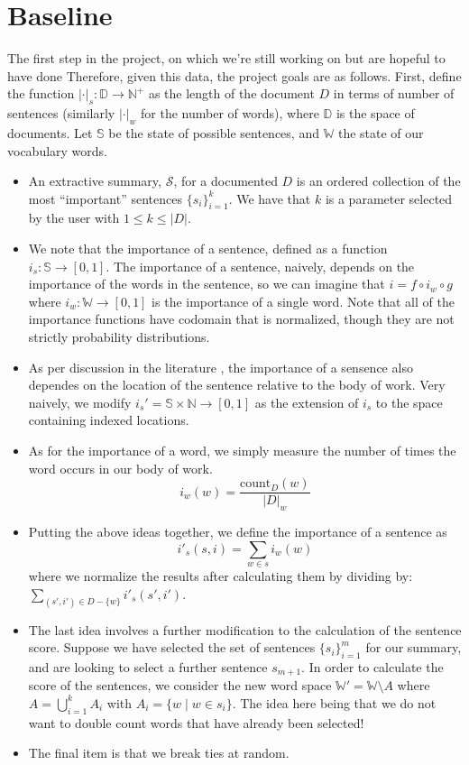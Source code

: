\documentclass[10pt]{article}
\begin{document}
\section{Baseline}
The first step in the project, on which we're still working on but are hopeful to have done
Therefore, given this data, the project goals are as follows. First, define the function $|\cdot|_s : \mathbb{D} \to \mathbb{N}^+$ as the length of the document $D$ in terms of number of sentences (similarly $|\cdot|_w$ for the number of words), where $\mathbb{D}$ is the space of documents. Let $\mathbb{S}$ be the state of possible sentences, and $\mathbb{W}$ the state of our vocabulary words.
\begin{itemize}
\item An extractive summary, $\mathcal{S}$, for a documented $D$ is an ordered collection of the most ``important'' sentences $\{s_i\}_{i=1}^k$. We have that $k$ is a parameter selected by the user with $1 \leq k \leq |D|$.
\item We note that the importance of a sentence, defined as a function $i_s: \mathbb{S} \to [0,1]$. The importance of a sentence, naively, depends on the importance of the words in the sentence, so we can imagine that $i = f \circ i_w \circ g$ where $i_w: \mathbb{W} \to [0,1]$ is the importance of a single word. Note that all of the importance functions have codomain that is normalized, though they are not strictly probability distributions.
\item As per discussion in the literature \cite{sentence_summary} \cite{hmm_summary} \cite{survey}, the importance of a sensence also dependes on the location of the sentence relative to the body of work. Very naively, we modify $i_s' = \mathbb{S} \times \mathbb{N} \to [0,1]$ as the extension of $i_s$ to the space containing indexed locations.
\item As for the importance of a word, we simply measure the number of times the word occurs in our body of work.
$$
i_w(w) = \frac{\text{count}_D(w)}{|D|_w}
$$
\item Putting the above ideas together, we define the importance of a sentence as
$$
i'_s(s,i) = \sum_{w \in s} i_w(w)
$$
where we normalize the results after calculating them by dividing by: $\sum_{(s',i') \in D - \{w\}} i'_s(s',i')$.
\item The last idea involves a further modification to the calculation of the sentence score. Suppose we have selected the set of sentences $\{s_i\}_{i=1}^m$ for our summary, and are looking to select a further sentence $s_{m+1}$. In order to calculate the score of the sentences, we consider the new word space $\mathbb{W'} = \mathbb{W} \setminus A$ where $A = \bigcup_{i=1}^k A_i$ with $A_i = \{w \mid w \in s_i\}$. The idea here being that we do not want to double count words that have already been selected!
\item The final item is that we break ties at random.
\end{itemize}
\end{document}

